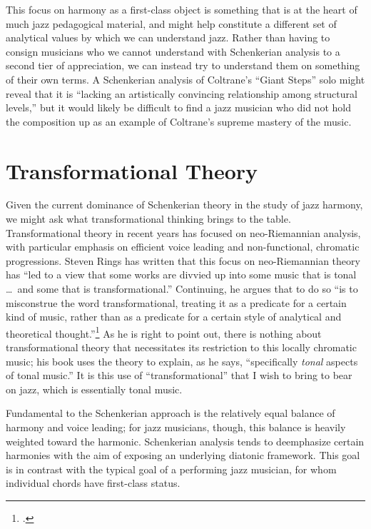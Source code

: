 This focus on harmony as a first-class object is something that is at the
heart of much jazz pedagogical material, and might help constitute a different
set of analytical values by which we can understand jazz. Rather than having
to consign musicians who we cannot understand with Schenkerian analysis to a
second tier of appreciation, we can instead try to understand them on
something of their own terms. A Schenkerian analysis of Coltrane’s “Giant
Steps” solo might reveal that it is “lacking an artistically convincing
relationship among structural levels,” but it would likely be difficult to
find a jazz musician who did not hold the composition up as an example of Coltrane’s
supreme mastery of the music.


\section{Transformational Theory}
\label{sec:transformational-theory} %

Given the current dominance of Schenkerian theory in the study of jazz
harmony, we might ask what transformational thinking brings to the table.
Transformational theory in recent years has focused on neo-Riemannian
analysis, with particular emphasis on efficient voice leading and
non-functional, chromatic progressions. Steven Rings has written that this
focus on neo-Riemannian theory has “led to a view that some works are divvied
up into some music that is tonal \ldots\ and some that is transformational.”
Continuing, he argues that to do so “is to misconstrue the word
transformational, treating it as a predicate for a certain kind of music,
rather than as a predicate for a certain style of analytical and theoretical
thought.”\footcite[9]{rings:2011} As he is right to point out, there is
nothing about transformational theory that necessitates its restriction to
this locally chromatic music; his book uses the theory to explain, as he says,
“specifically \emph{tonal} aspects of tonal music.” It is this use of
“transformational” that I wish to bring to bear on jazz, which is essentially
tonal music.

Fundamental to the Schenkerian approach is the relatively equal balance of
harmony and voice leading; for jazz musicians, though, this balance is heavily
weighted toward the harmonic.  Schenkerian analysis tends to deemphasize
certain harmonies with the aim of exposing an underlying diatonic framework.
This goal is in contrast with the typical goal of a performing jazz musician,
for whom individual chords have first-class status.

